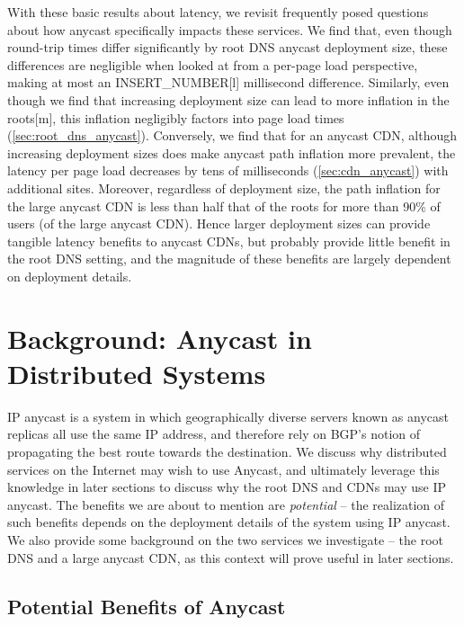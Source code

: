 \documentclass[sigconf,letterpaper,nonacm,10pt]{acmart}
\begin{document}
With these basic results about latency, we revisit frequently posed
questions about how anycast specifically impacts these services. We find
that, even though round-trip times differ significantly by root DNS
anycast deployment size, these differences are negligible when looked at
from a per-page load perspective, making at most an
INSERT\_NUMBER{[}l{]} millisecond difference. Similarly, even though we
find that increasing deployment size can lead to more inflation in the
roots{[}m{]}, this inflation negligibly factors into page load times
(\autoref{sec:root_dns_anycast}). Conversely, we find that for an
anycast CDN, although increasing deployment sizes does make anycast path
inflation more prevalent, the latency per page load decreases by tens of
milliseconds (\autoref{sec:cdn_anycast}) with additional sites.
Moreover, regardless of deployment size, the path inflation for the
large anycast CDN is less than half that of the roots for more than 90\%
of users (of the large anycast CDN). Hence larger deployment sizes can
provide tangible latency benefits to anycast CDNs, but probably provide
little benefit in the root DNS setting, and the magnitude of these
benefits are largely dependent on deployment details.

\hypertarget{background-anycast-in-distributed-systems}{%
\section{Background: Anycast in Distributed
Systems}\label{background-anycast-in-distributed-systems}}

\label{sec:anycast_distributed_systems} IP anycast is a system in which
geographically diverse servers known as anycast replicas all use the
same IP address, and therefore rely on BGP's notion of propagating the
best route towards the destination. We discuss why distributed services
on the Internet may wish to use Anycast, and ultimately leverage this
knowledge in later sections to discuss why the root DNS and CDNs may use
IP anycast. The benefits we are about to mention are \textit{potential}
-- the realization of such benefits depends on the deployment details of
the system using IP anycast. We also provide some background on the two
services we investigate -- the root DNS and a large anycast CDN, as this
context will prove useful in later sections.

\hypertarget{potential-benefits-of-anycast}{%
\subsection{Potential Benefits of
Anycast}\label{potential-benefits-of-anycast}}
\end{document}
